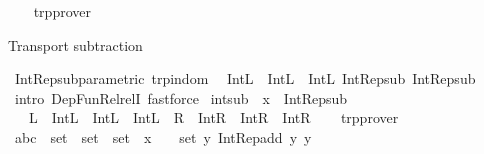 \begin{isabellebody}
%
\isadelimproof
\ \ %
\endisadelimproof
%
\isatagproof
{}\isamarkupfalse%
\ trp{\isacharunderscore}{\kern0pt}prover%
\endisatagproof
{\isafoldproof}%
%
\isadelimproof
%
\endisadelimproof
%
\begin{isamarkuptext}%
Transport subtraction%
\end{isamarkuptext}\isamarkuptrue%
\isamarkupfalse%
\ Int{\isacharunderscore}{\kern0pt}Rep{\isacharunderscore}{\kern0pt}sub{\isacharunderscore}{\kern0pt}parametric\ {\isacharbrackleft}{\kern0pt}trp{\isacharunderscore}{\kern0pt}in{\isacharunderscore}{\kern0pt}dom{\isacharbrackright}{\kern0pt}{\isacharcolon}{\kern0pt}\isanewline
\ \ {\isachardoublequoteopen}{\isacharparenleft}{\kern0pt}Int{\isachardot}{\kern0pt}L\ {\isasymRrightarrow}\ Int{\isachardot}{\kern0pt}L\ {\isasymRrightarrow}\ Int{\isachardot}{\kern0pt}L{\isacharparenright}{\kern0pt}\ Int{\isacharunderscore}{\kern0pt}Rep{\isacharunderscore}{\kern0pt}sub\ Int{\isacharunderscore}{\kern0pt}Rep{\isacharunderscore}{\kern0pt}sub{\isachardoublequoteclose}\isanewline
%
\isadelimproof
\ \ %
\endisadelimproof
%
\isatagproof
{}\isamarkupfalse%
\ {\isacharparenleft}{\kern0pt}intro\ Dep{\isacharunderscore}{\kern0pt}Fun{\isacharunderscore}{\kern0pt}Rel{\isacharunderscore}{\kern0pt}relI{\isacharparenright}{\kern0pt}\ fastforce%
\endisatagproof
{\isafoldproof}%
%
\isadelimproof
\isanewline
%
\endisadelimproof
\isanewline
{}\isamarkupfalse%
\ int{\isacharunderscore}{\kern0pt}sub\ \ x\ {\isacharequal}{\kern0pt}\ Int{\isacharunderscore}{\kern0pt}Rep{\isacharunderscore}{\kern0pt}sub\isanewline
\ \ \ L\ {\isacharequal}{\kern0pt}\ {\isachardoublequoteopen}Int{\isachardot}{\kern0pt}L\ {\isasymRrightarrow}\ Int{\isachardot}{\kern0pt}L\ {\isasymRrightarrow}\ Int{\isachardot}{\kern0pt}L{\isachardoublequoteclose}\ \ R\ {\isacharequal}{\kern0pt}\ {\isachardoublequoteopen}Int{\isachardot}{\kern0pt}R\ {\isasymRrightarrow}\ Int{\isachardot}{\kern0pt}R\ {\isasymRrightarrow}\ Int{\isachardot}{\kern0pt}R{\isachardoublequoteclose}\isanewline
%
\isadelimproof
\ \ %
\endisadelimproof
%
\isatagproof
{}\isamarkupfalse%
\ trp{\isacharunderscore}{\kern0pt}prover%
\endisatagproof
{\isafoldproof}%
%
\isadelimproof
\isanewline
%
\endisadelimproof
\isanewline
{}\isamarkupfalse%
\ abc\ {\isacharcolon}{\kern0pt}{\isacharcolon}{\kern0pt}\ {\isachardoublequoteopen}set\ {\isasymRightarrow}\ set\ {\isasymRightarrow}\ set{\isachardoublequoteclose}\ \ x\ {\isacharequal}{\kern0pt}\ {\isachardoublequoteopen}{\isasymlambda}{\isacharparenleft}{\kern0pt}{\isacharunderscore}{\kern0pt}\ {\isacharcolon}{\kern0pt}{\isacharcolon}{\kern0pt}\ set{\isacharparenright}{\kern0pt}\ y{\isachardot}{\kern0pt}\ Int{\isacharunderscore}{\kern0pt}Rep{\isacharunderscore}{\kern0pt}add\ y\ y{\isachardoublequoteclose}\ {\isacharbang}{\kern0pt}\isanewline

\end{isabellebody}
